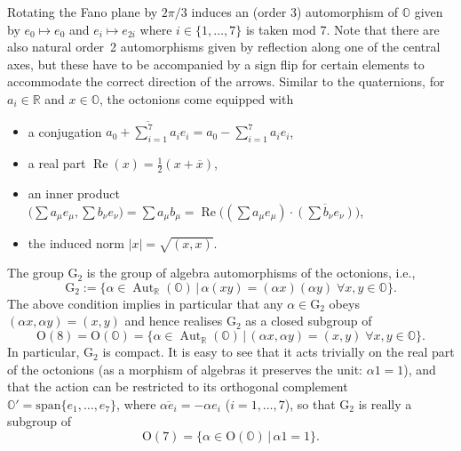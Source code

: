 \documentclass[10pt,a4paper]{amsart}
\numberwithin{equation}{section}
\newcommand{\Aut}{\operatorname{Aut}}
\newcommand{\Oct}{{\mathbb O}}
\begin{document}
Rotating the Fano plane by $2\pi/3$ induces an (order 3) automorphism of $\Oct$ given by $e_0 \mapsto e_0$ and $e_i \mapsto e_{2i}$ where $i \in \{1 , \dots , 7\}$ is taken mod 7. Note that there are also natural order~2 automorphisms given by reflection along one of the central axes, but these have to be accompanied by a sign flip for certain elements to accommodate the correct direction of the arrows.
Similar to the quaternions, for $a_i \in \mathbb{R}$ and $x \in \Oct$, the octonions come equipped with
\begin{itemize}\itemsep=0pt
\item a conjugation $\overline{a_0 + \sum_{i=1}^7 a_i e_i} = a_0 - \sum_{i=1}^7 a_i e_i$,
\item a real part $\operatorname{Re}(x) =\frac{1}{2} (x + \overline{x})$,
\item an inner product $\big(\sum a_\mu e_\mu , \sum b_\nu e_\nu \big) = \sum a_\mu b_\mu = \operatorname{Re}\big((\sum a_\mu e_\mu) \cdot \overline{(\sum b_\nu e_\nu)}\big)$,
\item the induced norm $| x | = \sqrt{(x,x)}$.
\end{itemize}

The group $\mathrm{G}_2$ is the group of algebra automorphisms of the octonions, i.e.,
\begin{equation*}
\mathrm{G}_2 := \{ \alpha \in \Aut_\mathbb{R}(\Oct) \, | \, \alpha (xy) = (\alpha x )(\alpha y) \; \forall x,y \in \Oct \}.
\end{equation*}
The above condition implies in particular that any $\alpha \in \mathrm{G}_2$ obeys $(\alpha x , \alpha y) = (x,y)$ and hence realises $\mathrm{G}_2$ as a closed subgroup of
\begin{equation*}
\mathrm{O}(8) = \mathrm{O}(\Oct) = \{ \alpha \in \Aut_\mathbb{R}(\Oct) \, | \, (\alpha x , \alpha y) = (x,y) \; \forall x,y \in \Oct \}.
\end{equation*}
In particular, $\mathrm{G}_2$ is compact. It is easy to see that it acts trivially on the real part of the octonions (as a morphism of algebras it preserves the unit: $\alpha 1 = 1$), and that the action can be restricted to its orthogonal complement $\Oct' = \textrm{span}\{ e_1 , \dots , e_7 \}$, where $\overline{\alpha e_i} = -\alpha e_i$ ($i=1,\dots,7$), so that $\mathrm{G}_2$ is really a subgroup of
\begin{equation*}
\mathrm{O}(7) = \{ \alpha \in \mathrm{O}(\Oct) \, | \, \alpha 1 = 1 \}.
\end{equation*}
\end{document}
